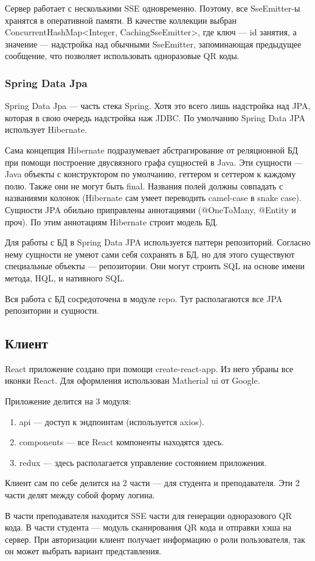 Сервер работает с несколькими SSE одновременно.
Поэтому, все SseEmitter-ы хранятся в оперативной памяти.
В качестве коллекции выбран ConcurrentHashMap<Integer, CachingSseEmitter>, где ключ --- id занятия, а значение --- надстройка над обычными SseEmitter, запоминающая предыдущее сообщение, что позволяет использовать одноразовые QR коды.

\subsubsection{Spring Data Jpa}

Spring Data Jpa --- часть стека Spring.
Хотя это всего лишь надстройка над JPA, которая в свою очередь надстройка наж JDBC.
По умолчанию Spring Data JPA использует Hibernate.

Сама концепция Hibernate подразумевает абстрагирование от реляционной БД при помощи построение двусвязного графа сущностей в Java.
Эти сущности --- Java объекты с конструктором по умолчанию, геттером и сеттером к каждому полю.
Также они не могут быть final.
Названия полей должны совпадать с названиями колонок (Hibernate сам умеет переводить camel-case в snake case).
Сущности JPA обильно приправлены аннотациями (@OneToMany, @Entity и проч).
По этим аннотациям Hibernate строит модель БД.

Для работы с БД в Spring Data JPA используется паттерн репозиторий.
Согласно нему сущности не умеют сами себя сохранять в БД, но для этого существуют специальные объекты --- репозитории.
Они могут строить SQL на основе имени метода, HQL, и нативного SQL.

Вся работа с БД сосредоточена в модуле repo.
Тут располагаются все JPA репозитории и сущности.

\subsection{Клиент}

React приложение создано при помощи create-react-app.
Из него убраны все иконки React.
Для оформления использован Matherial ui от Google.

Приложение делится на 3 модуля:
\begin{enumerate}
    \item api --- доступ к эндпоинтам (используется axios).
    \item components --- все React компоненты находятся здесь.
    \item redux --- здесь располагается управление состоянием приложения.
\end{enumerate}

Клиент сам по себе делится на 2 части --- для студента и преподавателя.
Эти 2 части делят между собой форму логина.

В части преподавателя находится SSE части для генерации одноразового QR кода.
В части студента --- модуль сканирования QR кода и отправки хэша на сервер.
При авторизации клиент получает информацию о роли пользователя, так он может выбрать вариант представления.
